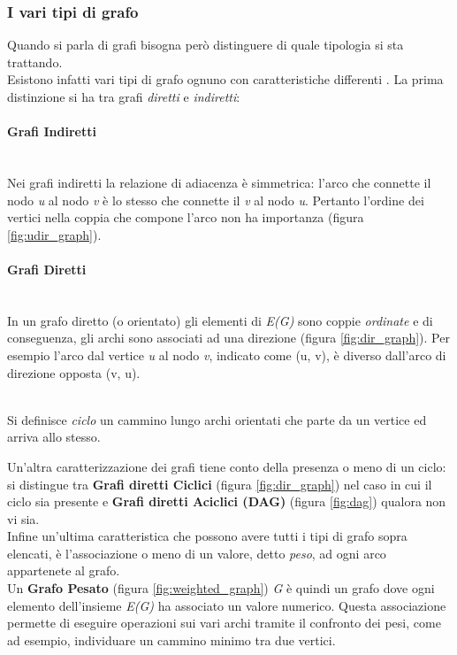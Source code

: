 \subsubsection{I vari tipi di grafo}\label{subsubsec:graph_type}
Quando si parla di grafi bisogna però distinguere di quale tipologia si sta trattando.\\
Esistono infatti vari tipi di grafo ognuno con caratteristiche differenti \cite{graph_theory}. La prima distinzione si ha tra grafi \emph{diretti} e \emph{indiretti}:

\paragraph{Grafi Indiretti}~\\
Nei grafi indiretti la relazione di adiacenza è simmetrica: l'arco che connette il nodo \textit{u} al nodo \textit{v} è lo stesso che connette il \textit{v} al nodo \textit{u}. Pertanto l'ordine dei vertici nella coppia che compone l'arco non ha importanza (figura \ref{fig:udir_graph}).

\paragraph{Grafi Diretti}~\\
In un grafo diretto (o orientato) gli elementi di \textit{E(G)} sono coppie \emph{ordinate} e di conseguenza, gli archi sono associati ad una direzione (figura \ref{fig:dir_graph}). Per esempio l'arco dal vertice \textit{u} al nodo \textit{v}, indicato come (u, v), è diverso dall'arco di direzione opposta (v, u).\\~\\

\begin{defn}
	Si definisce \emph{ciclo} un cammino lungo archi orientati che parte da un vertice ed arriva allo stesso.
\end{defn}

Un'altra caratterizzazione dei grafi tiene conto della presenza o meno di un ciclo: si distingue tra \textbf{Grafi diretti Ciclici} (figura \ref{fig:dir_graph}) nel caso in cui il ciclo sia presente e \textbf{Grafi diretti Aciclici (DAG)} (figura \ref{fig:dag}) qualora non vi sia.\\

Infine un'ultima caratteristica che possono avere tutti i tipi di grafo sopra elencati, è l'associazione o meno di un valore, detto \emph{peso}, ad ogni arco appartenete al grafo.\\
Un \textbf{Grafo Pesato} (figura \ref{fig:weighted_graph}) \textit{G} è quindi un grafo dove ogni elemento dell'insieme \textit{E(G)} ha associato un valore numerico. Questa associazione permette di eseguire operazioni sui vari archi tramite il confronto dei pesi, come ad esempio, individuare un cammino minimo tra due vertici.

